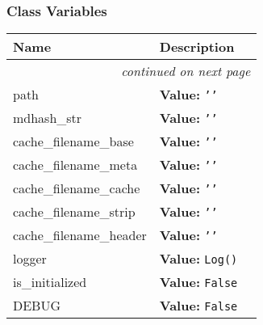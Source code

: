   \subsubsection{Class Variables}

    \vspace{-1cm}
\hspace{\varindent}\begin{longtable}{|p{\varnamewidth}|p{\vardescrwidth}|l}
\cline{1-2}
\cline{1-2} \centering \textbf{Name} & \centering \textbf{Description}& \\
\cline{1-2}
\endhead\cline{1-2}\multicolumn{3}{r}{\small\textit{continued on next page}}\\\endfoot\cline{1-2}
\endlastfoot\raggedright p\-a\-t\-h\- & \raggedright \textbf{Value:} 
{\tt \texttt{'}\texttt{}\texttt{'}}&\\
\cline{1-2}
\raggedright m\-d\-5\-h\-a\-s\-h\-\_\-s\-t\-r\- & \raggedright \textbf{Value:} 
{\tt \texttt{'}\texttt{}\texttt{'}}&\\
\cline{1-2}
\raggedright c\-a\-c\-h\-e\-\_\-f\-i\-l\-e\-n\-a\-m\-e\-\_\-b\-a\-s\-e\- & \raggedright \textbf{Value:} 
{\tt \texttt{'}\texttt{}\texttt{'}}&\\
\cline{1-2}
\raggedright c\-a\-c\-h\-e\-\_\-f\-i\-l\-e\-n\-a\-m\-e\-\_\-m\-e\-t\-a\- & \raggedright \textbf{Value:} 
{\tt \texttt{'}\texttt{}\texttt{'}}&\\
\cline{1-2}
\raggedright c\-a\-c\-h\-e\-\_\-f\-i\-l\-e\-n\-a\-m\-e\-\_\-c\-a\-c\-h\-e\- & \raggedright \textbf{Value:} 
{\tt \texttt{'}\texttt{}\texttt{'}}&\\
\cline{1-2}
\raggedright c\-a\-c\-h\-e\-\_\-f\-i\-l\-e\-n\-a\-m\-e\-\_\-s\-t\-r\-i\-p\- & \raggedright \textbf{Value:} 
{\tt \texttt{'}\texttt{}\texttt{'}}&\\
\cline{1-2}
\raggedright c\-a\-c\-h\-e\-\_\-f\-i\-l\-e\-n\-a\-m\-e\-\_\-h\-e\-a\-d\-e\-r\- & \raggedright \textbf{Value:} 
{\tt \texttt{'}\texttt{}\texttt{'}}&\\
\cline{1-2}
\raggedright l\-o\-g\-g\-e\-r\- & \raggedright \textbf{Value:} 
{\tt Log()}&\\
\cline{1-2}
\raggedright i\-s\-\_\-i\-n\-i\-t\-i\-a\-l\-i\-z\-e\-d\- & \raggedright \textbf{Value:} 
{\tt False}&\\
\cline{1-2}
\raggedright D\-E\-B\-U\-G\- & \raggedright \textbf{Value:} 
{\tt False}&\\
\cline{1-2}
\end{longtable}

